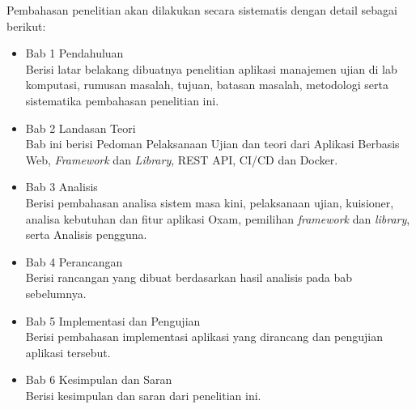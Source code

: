 Pembahasan penelitian akan dilakukan secara sistematis dengan detail sebagai
berikut:

\begin{itemize}
    \item Bab 1 Pendahuluan \\
        Berisi latar belakang dibuatnya penelitian aplikasi manajemen ujian di lab komputasi, 
        rumusan masalah, tujuan, batasan masalah, metodologi serta sistematika pembahasan penelitian ini.
    
    \item Bab 2 Landasan Teori \\
        Bab ini berisi Pedoman Pelaksanaan Ujian dan teori dari Aplikasi
        Berbasis Web, \textit{Framework} dan
        \textit{Library}, REST API, CI/CD dan Docker.
        
    \item Bab 3 Analisis \\
        Berisi pembahasan analisa sistem masa kini, pelaksanaan ujian,
        kuisioner, analisa kebutuhan dan fitur aplikasi Oxam, pemilihan
        \textit{framework} dan \textit{library}, serta Analisis pengguna.
        
    \item Bab 4 Perancangan \\
        Berisi rancangan yang dibuat berdasarkan hasil analisis pada bab
        sebelumnya.
    
    \item Bab 5 Implementasi dan Pengujian \\
        Berisi pembahasan implementasi aplikasi yang dirancang dan
        pengujian aplikasi tersebut.
        
    \item Bab 6 Kesimpulan dan Saran \\
        Berisi kesimpulan dan saran dari penelitian ini.
\end{itemize}